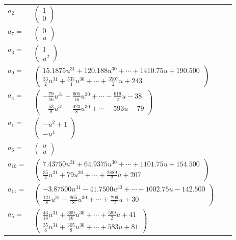 \documentclass[1p]{elsarticle_modified}
\theoremstyle{definition}
\begin{document}
\begin{tabular}{m{7pt} m{180pt} m{7pt} m{180pt} }
\flushright $a_{2}=$&$\begin{pmatrix}1\\0\end{pmatrix}$ \\
\flushright $a_{7}=$&$\begin{pmatrix}0\\u\end{pmatrix}$ \\
\flushright $a_{3}=$&$\begin{pmatrix}1\\u^2\end{pmatrix}$ \\
\flushright $a_{9}=$&$\begin{pmatrix}15.1875 u^{31}+120.188 u^{30}+\cdots+1410.75 u+190.500\\\frac{33}{2} u^{31}+\frac{537}{4} u^{30}+\cdots+\frac{3507}{2} u+243\end{pmatrix}$ \\
\flushright $a_{4}=$&$\begin{pmatrix}-\frac{79}{16} u^{31}-\frac{605}{16} u^{30}+\cdots-\frac{619}{2} u-38\\-\frac{53}{8} u^{31}-\frac{423}{8} u^{30}+\cdots-593 u-79\end{pmatrix}$ \\
\flushright $a_{1}=$&$\begin{pmatrix}- u^2+1\\- u^4\end{pmatrix}$ \\
\flushright $a_{6}=$&$\begin{pmatrix}u\\u\end{pmatrix}$ \\
\flushright $a_{10}=$&$\begin{pmatrix}7.43750 u^{31}+64.9375 u^{30}+\cdots+1101.75 u+154.500\\\frac{35}{4} u^{31}+79 u^{30}+\cdots+\frac{2889}{2} u+207\end{pmatrix}$ \\
\flushright $a_{11}=$&$\begin{pmatrix}-3.87500 u^{31}-41.7500 u^{30}+\cdots-1002.75 u-142.500\\\frac{121}{8} u^{31}+\frac{865}{8} u^{30}+\cdots+\frac{709}{2} u+30\end{pmatrix}$ \\
\flushright $a_{5}=$&$\begin{pmatrix}\frac{43}{16} u^{31}+\frac{369}{16} u^{30}+\cdots+\frac{599}{2} u+41\\\frac{35}{8} u^{31}+\frac{305}{8} u^{30}+\cdots+583 u+81\end{pmatrix}$ \\

\end{tabular}
\end{document}
